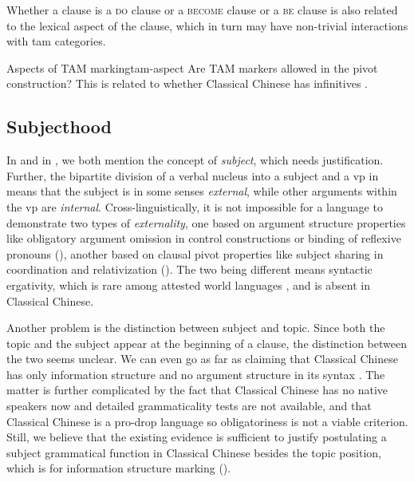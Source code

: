 \documentclass[UTF8, a4paper, oneside, scheme=plain, 12pt]{ctexrep}
\newcommand*{\citepage}[1]{p.~{#1}}
\newcommand*{\term}[1]{\emph{#1}}
\newcommand*{\category}[1]{\textsc{#1}}
\begin{document}
Whether a clause is a \category{do} clause or a \category{become} clause or a \category{be} clause
is also related to the lexical aspect of the clause,
which in turn may have non-trivial interactions with \ac{tam} categories.

\begin{todobox}{Aspects of TAM marking}{tam-aspect}
    Are TAM markers allowed in the pivot construction?
    This is related to whether Classical Chinese has infinitives \citep[\citepage{375}]{meiguang2018}.
\end{todobox}

\subsection{Subjecthood}\label{sec:grammatical.verbal.subject}

In  and in ,
we both mention the concept of \term{subject},
which needs justification.
Further, the bipartite division of a verbal nucleus into a subject and a \ac{vp} in  means that
the subject is in some senses \emph{external},
while other arguments within the \ac{vp} are \emph{internal}.
Cross-linguistically, it is not impossible for a language to demonstrate two types of \term{externality},
one based on argument structure properties like obligatory argument omission in control constructions
or binding of reflexive pronouns
(),
another based on clausal pivot properties like subject sharing in coordination and relativization
().
The two being different means syntactic ergativity,
which is rare among attested world languages \citep{aldridge2008generative},
and is absent in Classical Chinese.

Another problem is the distinction between subject and topic.
Since both the topic and the subject appear at the beginning of a clause,
the distinction between the two seems unclear.
We can even go as far as claiming that 
Classical Chinese has only information structure and no argument structure in its syntax
\citep[\citepage{122}]{meiguang2018}.
The matter is further complicated by the fact that Classical Chinese has no native speakers now
and detailed grammaticality tests are not available,
and that Classical Chinese is a pro-drop language 
so obligatoriness is not a viable criterion.
Still, we believe that the existing evidence is sufficient to justify postulating a subject grammatical function in Classical Chinese
besides the topic position, which is for information structure marking
().
\end{document}
